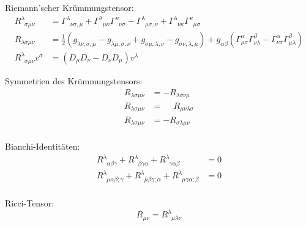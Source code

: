 			\noindent
			Riemann'scher Krümmungstensor:
			\begin{equation}
				\begin{aligned}
					R^{\lambda}_{\phantom{\lambda}\sigma\mu\nu} &= \Gamma^{\lambda}_{\phantom{\lambda}\nu\sigma,\mu}
					+ \Gamma^{\lambda}_{\phantom{\lambda}\mu\kappa}\Gamma^{\kappa}_{\phantom{\kappa}\nu\sigma}
					-
					\Gamma^{\lambda}_{\phantom{\lambda}\mu\sigma,\nu}
					+ \Gamma^{\lambda}_{\phantom{\lambda}\nu\kappa}\Gamma^{\kappa}_{\phantom{\kappa}\mu\sigma} \\
					R_{\lambda\sigma\mu\nu} &= \frac{1}{2}\left(
					g_{\lambda\nu,\sigma,\mu} - g_{\lambda\mu,\sigma,\nu} + g_{\sigma\mu,\lambda,\nu} -	 g_{\sigma\nu,\lambda,\mu}
					\right)
					+ g_{\alpha\beta} \left(
					\Gamma^{\alpha}_{\mu\sigma} \Gamma^{\beta}_{\nu\lambda} - \Gamma^{\alpha}_{\nu\sigma} \Gamma^{\beta}_{\mu\lambda}
					\right)
					\\
					R^{\lambda}_{\phantom{\lambda}\sigma\mu\nu}v^\sigma &= \left(D_\mu D_\nu - D_\nu D_\mu \right) v^\lambda
				\end{aligned}
			\end{equation}

			\noindent
			Symmetrien des Krümmungstensors:
			\begin{equation}
				\begin{aligned}
					R_{\lambda\sigma\mu\nu} &= - R_{\lambda\sigma\nu\mu} \\
					R_{\lambda\sigma\mu\nu} &= \phantom{-} R_{\mu\nu\lambda\sigma} \\
					R_{\lambda\sigma\mu\nu} &= - R_{\sigma\lambda\mu\nu} \\
				\end{aligned}
			\end{equation}

			\noindent
			Bianchi-Identitäten:
			\begin{equation}
				\begin{aligned}
					R^{\lambda}_{\phantom{\lambda}\alpha\beta\gamma} + R^{\lambda}_{\phantom{\lambda}\beta\gamma\alpha} + R^{\lambda}_{\phantom{\lambda}\gamma\alpha\beta} &= 0 \\
					R^{\lambda}_{\phantom{\lambda}\mu\alpha\beta;\gamma} + R^{\lambda}_{\phantom{\lambda}\mu\beta\gamma;\alpha} + R^{\lambda}_{\phantom{\lambda}\mu\gamma\alpha;\beta} &= 0 \\
				\end{aligned}
			\end{equation}

			\noindent
			Ricci-Tensor:
			\begin{equation}
				R_{\mu\nu} = R^\lambda_{\phantom{\lambda}\mu\lambda\nu}
			\end{equation}


